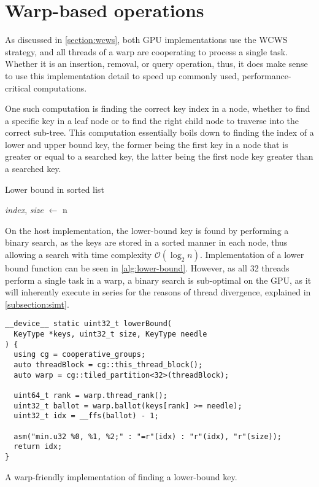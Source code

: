 \section{Warp-based operations}

As discussed in \cref{section:wcws}, both GPU implementations use the WCWS strategy, and all threads of a warp are cooperating to process a single task. Whether it is an insertion, removal, or query operation, thus, it does make sense to use this implementation detail to speed up commonly used, performance-critical computations.

One such computation is finding the correct key index in a node, whether to find a specific key in a leaf node or to find the right child node to traverse into the correct sub-tree. This computation essentially boils down to finding the index of a lower and upper bound key, the former being the first key in a node that is greater or equal to a searched key, the latter being the first node key greater than a searched key.

\begin{algorithm}
  \caption{Lower bound in sorted list}\label{alg:lower-bound}
  \DontPrintSemicolon


  \textit{index}, \textit{size} $\gets$ n\;
  \;
\end{algorithm}

On the host implementation, the lower-bound key is found by performing a binary search, as the keys are stored in a sorted manner in each node, thus allowing a search with time complexity $\mathcal{O}(\log_2 n)$. Implementation of a lower bound function can be seen in \cref{alg:lower-bound}. However, as all 32 threads perform a single task in a warp, a binary search is sub-optimal on the GPU, as it will inherently execute in series for the reasons of thread divergence, explained in \cref{subsection:simt}.

\begin{listing}
  \begin{verbatim}
__device__ static uint32_t lowerBound(
  KeyType *keys, uint32_t size, KeyType needle
) {
  using cg = cooperative_groups;
  auto threadBlock = cg::this_thread_block();
  auto warp = cg::tiled_partition<32>(threadBlock);

  uint64_t rank = warp.thread_rank();
  uint32_t ballot = warp.ballot(keys[rank] >= needle);
  uint32_t idx = __ffs(ballot) - 1;

  asm("min.u32 %0, %1, %2;" : "=r"(idx) : "r"(idx), "r"(size));
  return idx;
}
  \end{verbatim}
  \caption{A warp-friendly implementation of finding a lower-bound key.}
  \label{lst:lower-bound-cuda}
\end{listing}

